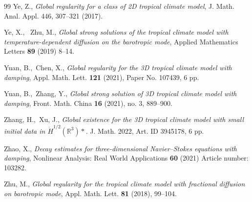 \documentclass[a4paper]{article}
\newcommand{\R}{\mathbb{R}}
\begin{document}
\begin{thebibliography}{99}
      Ye, Z., \emph{Global regularity for a class of 2D tropical climate model},
J. Math. Anal. Appl. 446, 307–321 (2017).

 Ye, X., \ Zhu, M., \emph{Global strong solutions of the tropical climate model
with temperature-dependent diffusion on the barotropic mode}, Applied
Mathematics Letters \textbf{89} (2019) 8–14.
  
 Yuan, B.,\ Chen, X., \emph{Global regularity for
    the 3D tropical climate model with damping},
  Appl. Math. Lett. \textbf{121} (2021), Paper No. 107439, 6 pp.
    
 Yuan, B.,\ Zhang, Y., \emph{Global strong solution
    of 3D tropical climate model with damping}, Front. Math. China
  \textbf{16} (2021), no. 3, 889--900.
 
  
 Zhang, H.,\ Xu, J., \emph{Global existence for the 3D
    tropical climate model with small initial data in
    $\dot H^{1/2}(\R^3)\ast$.} J. Math. 2022, Art. ID 3945178, 6 pp.
    
    Zhao, X., \emph{Decay estimates for three-dimensional
    Navier--Stokes equations with damping}, Nonlinear Analysis: Real
  World Applications \textbf{60} (2021) Article number: 103282.

    
 Zhu, M., \emph{Global regularity for the tropical
    climate model with fractional diffusion on barotropic mode},
  Appl. Math. Lett. \textbf{81} (2018), 99--104.             
\end{thebibliography}
%   
\end{document}
